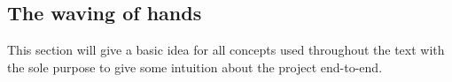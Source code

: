 \documentclass[main.tex]{subfiles}
\begin{document}
\subsection{The waving of hands}
This section will give a basic idea for all concepts used throughout the text
with the sole purpose to give some intuition about the project end-to-end.

\end{document}
